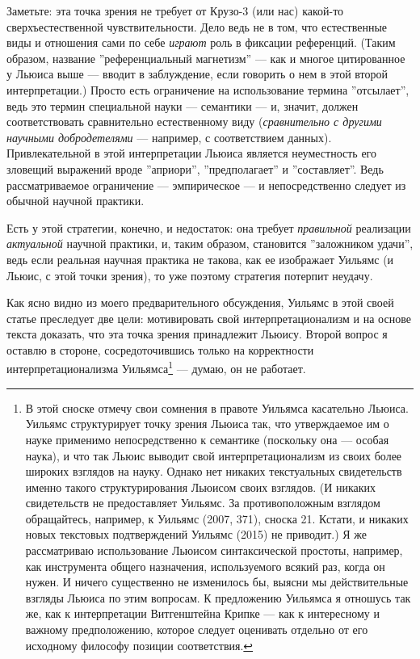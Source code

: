 \documentclass[11pt]{book}
\begin{document}
Заметьте: эта точка зрения не требует от Крузо-3 (или нас) какой-то сверхъестественной чувствительности. Дело ведь не в том, что естественные виды и отношения сами по себе \textit{играют} роль в фиксации референций. (Таким образом, название ''референциальный магнетизм'' --- как и многое цитированное у Льюиса выше --- вводит в заблуждение, если говорить о нем в этой второй интерпретации.) Просто есть ограничение на использование термина ''отсылает'', ведь это термин специальной науки --- семантики --- и, значит, должен соответствовать сравнительно естественному виду (\textit{сравнительно с другими научными добродетелями} --- например, с соответствием данных). Привлекательной в этой интерпретации Льюиса является неуместность его зловещий выражений вроде ''априори'', ''предполагает'' и ''составляет''. Ведь рассматриваемое ограничение --- эмпирическое --- и непосредственно следует из обычной научной практики.

Есть у этой стратегии, конечно, и недостаток: она требует \textit{правильной} реализации \textit{актуальной} научной практики, и, таким образом, становится ''заложником удачи'', ведь если реальная научная практика не такова, как ее изображает Уильямс (и Льюис, с этой точки зрения), то уже поэтому стратегия потерпит неудачу.

Как ясно видно из моего предварительного обсуждения, Уильямс в этой своей статье преследует две цели: мотивировать свой интерпретационализм и на основе текста доказать, что эта точка зрения принадлежит Льюису. Второй вопрос я оставлю в стороне, сосредоточившись только на корректности интерпретационализма Уильямса\footnote{В этой сноске отмечу свои сомнения в правоте Уильямса касательно Льюиса. Уильямс структурирует точку зрения Льюиса так, что утверждаемое им о науке применимо непосредственно к семантике (поскольку она --- особая наука), и что так Льюис выводит свой интерпретационализм из своих более широких взглядов на науку. Однако  нет никаких текстуальных свидетельств именно такого структурирования Льюисом своих взглядов. (И никаких свидетельств не предоставляет Уильямс. За противоположным взглядом обращайтесь, например, к Уильямс (2007, 371), сноска 21. Кстати, и никаких новых текстовых подтверждений Уильямс (2015) не приводит.) Я же рассматриваю использование Льюисом синтаксической простоты, например, как инструмента общего назначения, используемого всякий раз, когда он нужен. И ничего существенно не изменилось бы, выясни мы действительные взгляды Льюиса по этим вопросам. К предложению Уильямса я отношусь так же, как к интерпретации Витгенштейна Крипке --- как к интересному и важному предположению, которое следует оценивать отдельно от его исходному философу позиции соответствия.} --- думаю, он не работает.
\end{document}
